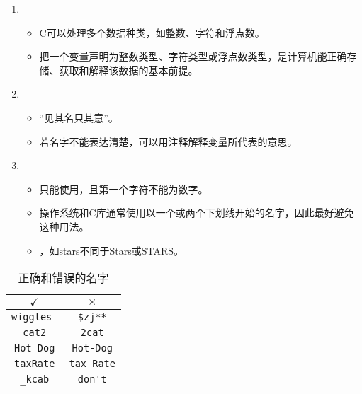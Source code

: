 \begin{frame}[fragile]
\begin{enumerate}[1]
\item {}\\[0.1in]
\begin{itemize}
\item   C可以处理多个数据种类，如整数、字符和浮点数。\\[0.1in]
\item   把一个变量声明为整数类型、字符类型或浮点数类型，是计算机能正确存储、获取和解释该数据的基本前提。
\end{itemize}

\item {}\\[0.1in]
\begin{itemize}
\item  “见其名只其意”。\\[0.1in]
\item  若名字不能表达清楚，可以用注释解释变量所代表的意思。\\[0.1in]
\end{itemize}

\item {} \\[0.1in]
\begin{itemize}
\item 只能使用，且第一个字符不能为数字。 \\[0.1in]
\item 操作系统和C库通常使用以一个或两个下划线开始的名字，因此最好避免这种用法。 \\[0.1in]
\item {}，如stars不同于Stars或STARS。
\end{itemize}
\end{enumerate}

\end{frame}


\begin{frame}[fragile]

\begin{table}
\centering
\caption{正确和错误的名字}
\begin{tabular}{c|c}\hline
${\checkmark}$&${\times}$\\[0.1in]\hline
\lstinline|wiggles |&   \lstinline|$zj**|\\[0.1in]
\lstinline|cat2| &  \lstinline|2cat|\\[0.1in]
\lstinline|Hot_Dog| &  \lstinline|Hot-Dog|\\[0.1in]
\lstinline|taxRate| &  \lstinline|tax Rate|\\[0.1in]
\lstinline|_kcab| &  \lstinline|don't|\\\hline
\end{tabular}
\end{table}


\end{frame}


